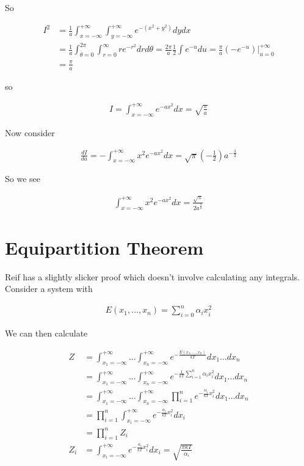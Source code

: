 \documentclass[12pt]{article}
\begin{document}
So

\begin{align}
I^2 &= \frac{1}{a} \int_{x=-\infty}^{+\infty}\int_{y=-\infty}^{+\infty} e^{-(x^2+y^2)}dydx\\
&= \frac{1}{a}\int_{\theta=0}^{2\pi}\int_{r=0}^{\infty} r e^{-r^2}drd\theta = \frac{2\pi}{a} \frac{1}{2}\int e^{-u}du = \frac{\pi}{a} (-e^{-u})\Big\rvert_{u=0}^{+\infty}\\
&= \frac{\pi}{a}
\end{align}

so

\begin{align}
I = \int_{x=-\infty}^{+\infty} e^{-ax^2} dx = \sqrt{\frac{\pi}{a}}
\end{align}

Now consider

\begin{align}
\frac{dI}{da} = -\int_{x=-\infty}^{+\infty} x^2 e^{-a x^2} dx = \sqrt{\pi} \left(-\frac{1}{2}\right) a^{-\frac{3}{2}}
\end{align}

So we see

\begin{align}
\int_{x=-\infty}^{+\infty} x^2 e^{-a x^2} dx = \frac{\sqrt{\pi}}{2 a^{\frac{3}{2}}}
\end{align}

\section{Equipartition Theorem}

Reif has a slightly slicker proof which doesn't involve calculating any integrals.
Consider a system with

\begin{align}
E(x_1,\ldots,x_n) = \sum_{i=0}^n \alpha_i x_i^2
\end{align}

We can then calculate

\begin{align}
Z &= \int_{x_1=-\infty}^{+\infty}\ldots \int_{x_n = -\infty}^{+\infty} e^{-\frac{E(x_1,\ldots,x_n)}{kT}} dx_1\ldots dx_n\\
&=\int_{x_1=-\infty}^{+\infty}\ldots \int_{x_n = -\infty}^{+\infty} e^{-\frac{1}{kT}\sum_{i=1}^n \alpha_i x_i^2} dx_1\ldots dx_n\\
&=\int_{x_1=-\infty}^{+\infty}\ldots \int_{x_n = -\infty}^{+\infty} \prod_{i=1}^n e^{-\frac{\alpha_i}{kT} x_i^2} dx_1\ldots dx_n\\
&= \prod_{i=1}^n \int_{x_i=-\infty}^{+\infty} e^{-\frac{\alpha_i}{kT} x_i^2} dx_i\\
&= \prod_{i=1}^n Z_i\\
Z_i &= \int_{x_i=-\infty}^{+\infty} e^{-\frac{\alpha_i}{kT} x_i^2} dx_i = \sqrt{\frac{\pi kT}{\alpha_i}}
\end{align}
\end{document}
